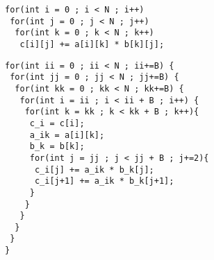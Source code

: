 \documentclass{article}
\begin{document}
\begin{figure}

\begin{lrbox}{\mylistingbox}%
\begin{minipage}{.45\linewidth}%
\begin{lstlisting}
for(int i = 0 ; i < N ; i++)
 for(int j = 0 ; j < N ; j++)
  for(int k = 0 ; k < N ; k++)
   c[i][j] += a[i][k] * b[k][j];
\end{lstlisting}%
\end{minipage}%
\end{lrbox}%
%
%
%
\hfill
%
\begin{lrbox}{\mylistingbox}%
\begin{minipage}{.45\linewidth}%
\begin{lstlisting}
for(int ii = 0 ; ii < N ; ii+=B) {
 for(int jj = 0 ; jj < N ; jj+=B) {
  for(int kk = 0 ; kk < N ; kk+=B) {
   for(int i = ii ; i < ii + B ; i++) {
    for(int k = kk ; k < kk + B ; k++){
     c_i = c[i];
     a_ik = a[i][k];
     b_k = b[k];
     for(int j = jj ; j < jj + B ; j+=2){
      c_i[j] += a_ik * b_k[j];
      c_i[j+1] += a_ik * b_k[j+1];
     }
    }
   }
  }
 }
}
\end{lstlisting}%
\end{minipage}%
\end{lrbox}%
%
%

\end{figure}
\end{document}
